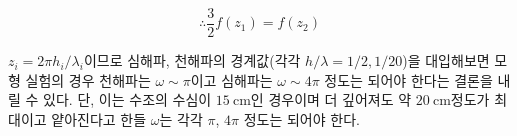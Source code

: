 \begin{equation}
    \therefore \frac{3}{2}f(z_1 ) = f(z_2 )
\end{equation}

$z_i = 2\pi h_i/\lambda_i$이므로 심해파, 천해파의 경계값(각각 $h/\lambda = 1/2, 1/20$)을 대입해보면 모형 실험의 경우 천해파는 $\omega \sim \pi$이고 심해파는 $\omega \sim 4\pi$ 정도는 되어야 한다는 결론을 내릴 수 있다. 단, 이는 수조의 수심이 $15\mathrm{~cm}$인 경우이며 더 깊어져도 약 $20\mathrm{~cm}$정도가 최대이고 얕아진다고 한들 $\omega$는 각각 $\pi$, $4\pi$ 정도는 되어야 한다.




